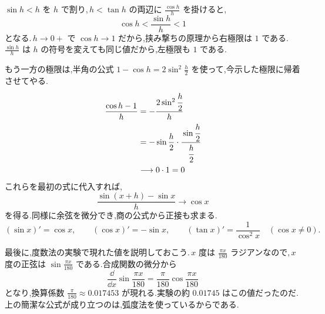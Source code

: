 $\sin h<h$ を $h$ で割り,\,$h<\tan h$ の両辺に $\frac{\cos h}{h}$ を掛けると,
\[
 \cos h<\frac{\sin h}{h}<1
\]
となる.\,$h\to0+$ で $\cos h\to1$ だから,挟み撃ちの原理から右極限は $1$ である.\,$\frac{\sin h}{h}$ は $h$ の符号を変えても同じ値だから,左極限も $1$ である.

もう一方の極限は,半角の公式 $1-\cos h=2\sin^2\frac h2$ を使って,今示した極限に帰着させてやる.
\begin{align*}
 \frac{\cos h-1}{h}
 &=-\cfrac{2\sin^2\cfrac h2}{h}\\
 &=-\sin\frac h2\cdot\cfrac{\sin\cfrac h2}{\cfrac h2}\\
 &\longrightarrow0\cdot1=0
\end{align*}
これらを最初の式に代入すれば,
\[
 \frac{\sin(x+h)-\sin x}{h}\longrightarrow\cos x
\]
を得る.同様に余弦を微分でき,商の公式から正接も求まる.
\[
 (\sin x)'=\cos x,\qquad
 (\cos x)'=-\sin x,\qquad
 (\tan x)'=\frac1{\cos^2x}\quad(\cos x\ne0).
\]

最後に,度数法の実験で現れた値を説明しておこう.\,$x$ 度は $\frac{\pi x}{180}$ ラジアンなので,\,$x$ 度の正弦は $\sin\frac{\pi x}{180}$ である.合成関数の微分から
\[
 \frac{\dd}{\dd x}\sin\frac{\pi x}{180}=\frac{\pi}{180}\cos\frac{\pi x}{180}
\]
となり,換算係数 $\frac{\pi}{180}\approx0.017453$ が現れる.実験の約 $0.01745$ はこの値だったのだ.上の簡潔な公式が成り立つのは,弧度法を使っているからである.
